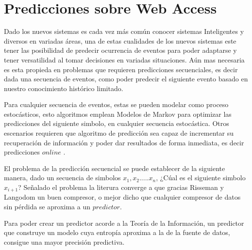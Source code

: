 \chapter[Predicciones sobre Web Access]{Predicciones sobre Web Access} \label{ch:tema}



Dado los nuevos sistemas es cada vez más común conocer sistemas Inteligentes y diversos en variadas áreas, una de estas cualidades de los nuevos sistemas este tener las posibilidad de predecir ocurrencia de eventos para poder adaptarse y tener versatilidad al tomar decisiones en variadas situaciones. Aún mas necesaria es esta propieda en problemas que requieren predicciones secuenciales, es decir dada una secuencia de eventos, como poder predecir el siguiente evento basado en nuestro conocimiento histórico limitado.

Para cualquier secuencia de eventos, estas se pueden modelar como proceso estocásticos, esto algoritmos emplean Modelos de Markov para optimizar las predicciones del siguiente simbolo, en cualquier secuencia estocástica. Otros escenarios requieren que algoritmo de predicción sea capaz de incrementar su recuperación de información  y poder dar resultados de forma inmediata, es decir predicciones $online$ .

El problema de la predicción secuencial se puede establecer de la siguiente manera, dado un secuencia de simbolos $x_{1}, x_{2}.....x_{n}$, ¿Cúal es el siguiente simbolo $x_{i+1}$? Señalado el problema la literura converge a que gracias Risseman y Langodom
un buen compresor, o mejor dicho que cualquier compresor de datos sin pérdida se aproxima a un $predictor$.

Para poder crear un predictor acorde a la Teoría de la Información, un predictor que construye un modelo cuya entropía aproxima a la de la fuente de datos, consigue una mayor precisión predictiva.






